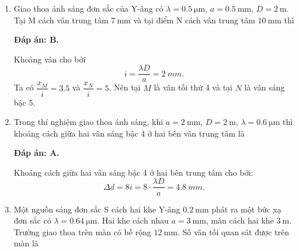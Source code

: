 \begin{enumerate}[label=\bfseries Câu \arabic*:]
	\item {} 
		\cauhoi
	{Giao thoa ánh sáng đơn sắc của Y-âng có $\lambda=\SI{0.5}{\micro \meter}$, $a=\SI{0.5}{\milli \meter}$, $D=\SI{2}{\meter}$. Tại M cách vân trung tâm $\SI{7}{\milli \meter}$ và tại điểm N cách vân trung tâm $\SI{10}{\milli \meter}$ thì
	}
	
	\loigiai
	{		\textbf{Đáp án: B.}
		
Khoảng vân cho bởi
$$
	i = \dfrac{\lambda D}{a} = \SI{2}{mm}.
$$
Ta có $ \dfrac{x_{M}}{i}=\num{3,5} $ và $ \dfrac{x_{N}}{i}=\num{5} $. Nên tại $ M $ là vân tối thứ 4 và tại $ N $ là vân sáng bậc 5.
		
	}
	
	\item {} 
		\cauhoi
	{Trong thí nghiệm giao thoa ánh sáng, khi $a=\SI{2}{\milli \meter}$, $D=\SI{2}{\meter}$, $\lambda=\SI{0.6}{\micro \meter}$ thì khoảng cách giữa hai vân sáng bậc 4 ở hai bên vân trung tâm là
	}
	
	\loigiai
	{		\textbf{Đáp án: A.}
		
Khoảng cách giữa hai vân sáng bậc 4 ở hai bên trung tâm cho bởi:
$$
	\Delta d = 8i = 8 \cdot \dfrac{\lambda D}{a} = \SI{4,8}{mm}.
$$
		
	}
	
	\item {} 
		\cauhoi
	{Một nguồn sáng đơn sắc S cách hai khe Y-âng $\SI{0.2}{\milli \meter}$ phát ra một bức xạ đơn sắc có $\lambda=\SI{0.64}{\micro \meter}$. Hai khe cách nhau $a=\SI{3}{\milli \meter}$, màn cách hai khe $\SI{3}{\meter}$. Trường giao thoa trên màn có bề rộng $\SI{12}{\milli \meter}$. Số vân tối quan sát được trên màn là
	}
	

\end{enumerate}
